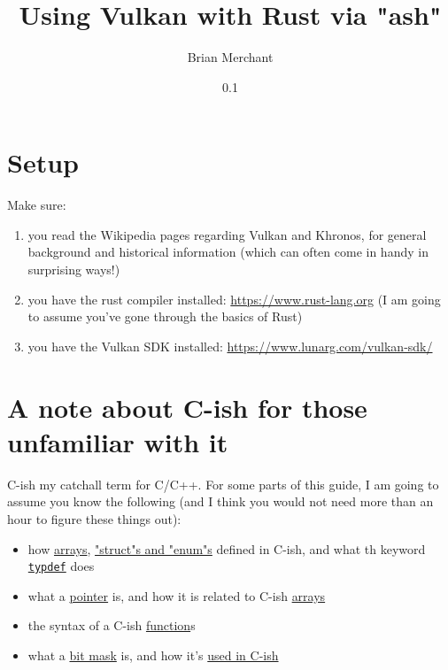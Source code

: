 \documentclass[12pt,letterpaper]{article}
\newcommand{\cil}[1]{\texttt{#1}}
\begin{document}
\title{Using Vulkan with Rust via "ash"}
\date{0.1}
\author{Brian Merchant}
\maketitle
\tableofcontents
\reversemarginpar


\section{Setup}
	Make sure:
		\begin{enumerate}
			\item you read the Wikipedia pages regarding Vulkan and Khronos, for general background and historical information (which can often come in handy in surprising ways!)
			
			\item you have the rust compiler installed: \href{https://www.rust-lang.org}{https://www.rust-lang.org} (I am going to assume you've gone through the basics of Rust)
			
			\item you have the Vulkan SDK installed: \href{https://www.lunarg.com/vulkan-sdk/}{https://www.lunarg.com/vulkan-sdk/}
		\end{enumerate}
	
\section{A note about C-ish for those unfamiliar with it}
	C-ish my catchall term for C/C++. For some parts of this guide, I am going to assume you know the following (and I think you would not need more than an hour to figure these things out):
		\begin{itemize}
			\item how \href{https://en.wikibooks.org/wiki/C_Programming/Arrays_and_strings}{arrays}, \href{https://en.wikibooks.org/wiki/C_Programming/Advanced_data_types}{"struct"s and "enum"s} defined in C-ish, and what th keyword \href{https://en.wikibooks.org/wiki/C_Programming/Advanced_data_types}{\cil{typdef}} does
			
			\item what a \href{https://en.wikibooks.org/wiki/C_Programming/Pointers_and_arrays}{pointer} is, and how it is related to C-ish \href{https://en.wikibooks.org/wiki/C_Programming/Pointers_and_arrays#Pointers_and_Arrays}{arrays}
			
			\item the syntax of a C-ish \href{https://en.wikibooks.org/wiki/C_Programming/Procedures_and_functions}{function}s
			
			\item what a \href{https://en.wikipedia.org/wiki/Mask_(computing)}{bit mask} is, and how it's \href{https://stackoverflow.com/questions/10493411/what-is-bit-masking}{used in C-ish}
		\end{itemize}
	
\end{document}
